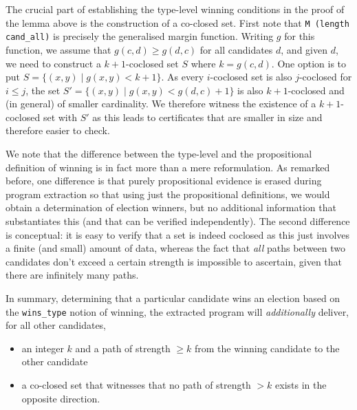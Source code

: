 \noindent
The crucial part of establishing the type-level winning conditions
in the proof of the lemma above is the construction of a co-closed set. 
First note that \texttt{M (length cand\_all)} is precisely
the generalised margin function. Writing $g$ for this function, we
assume that $g(c, d) \geq g(d, c)$ for all candidates $d$, and given
$d$, we need to construct a $k+1$-coclosed set $S$ where $k = g(c, d)$.
One option is to put
$S = \lbrace (x, y) \mid g(x, y) < k+1 \rbrace$. As every
$i$-coclosed set is also $j$-coclosed for $i \leq j$, the set $S' =
\lbrace (x, y) \mid g(x, y) < g(d, c) + 1 \rbrace$ is also
$k+1$-coclosed and (in general) of smaller cardinality. We therefore
witness the existence of a $k+1$-coclosed set with $S'$ as this
leads to certificates that are smaller in size and therefore easier
to check.

We note that the difference between the type-level and the
propositional definition of winning 
is in fact more than a mere reformulation. As remarked before, one
difference is that purely propositional evidence is erased during
program extraction so that using just the propositional definitions,
we would obtain a determination of election winners, but no
additional information that substantiates this (and that can be
verified independently). The second difference is conceptual: it is
easy to verify that a set is indeed coclosed as this just involves a
finite (and small) amount of data, whereas the fact that \emph{all} paths
between two candidates don't exceed a certain strength is impossible
to ascertain, given that there are infinitely many paths.

In summary, determining that a particular candidate wins an election
based on the \texttt{wins\_type} notion of winning, the extracted
program will \emph{additionally} deliver, for all other candidates,
\begin{itemize}
\item an integer $k$ and a path of strength $\geq k$ from the winning candidate to the
other candidate 
\item a co-closed set that witnesses that no path of strength $>k$
exists in the opposite direction.
\end{itemize}

